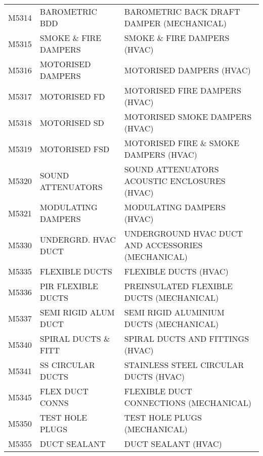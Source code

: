 \begin{longtable}[l]{l%
                  l|%
                  l|}
\rowcolor{thetableheadbgcolor!0.25!white} M5314       & BAROMETRIC BDD   & BAROMETRIC BACK DRAFT DAMPER (MECHANICAL)   \\
\rowcolor{thetableheadbgcolor!0.25!white} M5315       & SMOKE \& FIRE DAMPERS   & SMOKE \& FIRE DAMPERS (HVAC)   \\
\rowcolor{thetableheadbgcolor!0.25!white} M5316       & MOTORISED DAMPERS   & MOTORISED DAMPERS (HVAC)   \\
\rowcolor{thetableheadbgcolor!0.25!white} M5317       & MOTORISED FD   & MOTORISED FIRE DAMPERS (HVAC)   \\
\rowcolor{thetableheadbgcolor!0.25!white} M5318       & MOTORISED SD   & MOTORISED SMOKE DAMPERS (HVAC)   \\
\rowcolor{thetableheadbgcolor!0.25!white} M5319       & MOTORISED FSD   & MOTORISED FIRE \& SMOKE DAMPERS (HVAC)   \\
\rowcolor{thetableheadbgcolor!0.25!white} M5320       & SOUND ATTENUATORS   & SOUND ATTENUATORS ACOUSTIC ENCLOSURES (HVAC)   \\
\rowcolor{thetableheadbgcolor!0.25!white} M5321       & MODULATING DAMPERS   & MODULATING DAMPERS (HVAC)   \\
\rowcolor{thetableheadbgcolor!0.25!white} M5330       & UNDERGRD. HVAC DUCT   & UNDERGROUND HVAC DUCT AND ACCESSORIES (MECHANICAL)   \\
\rowcolor{thetableheadbgcolor!0.25!white} M5335       & FLEXIBLE DUCTS   & FLEXIBLE DUCTS (HVAC)   \\
\rowcolor{thetableheadbgcolor!0.25!white} M5336       & PIR FLEXIBLE DUCTS   & PREINSULATED FLEXIBLE DUCTS (MECHANICAL)   \\
\rowcolor{thetableheadbgcolor!0.25!white} M5337       & SEMI RIGID ALUM DUCT   & SEMI RIGID ALUMINIUM DUCTS (MECHANICAL)   \\
\rowcolor{thetableheadbgcolor!0.25!white} M5340       & SPIRAL DUCTS \& FITT   & SPIRAL DUCTS AND FITTINGS (HVAC)   \\
\rowcolor{thetableheadbgcolor!0.25!white} M5341       & SS CIRCULAR DUCTS   & STAINLESS STEEL CIRCULAR DUCTS (HVAC)   \\
\rowcolor{thetableheadbgcolor!0.25!white} M5345       & FLEX DUCT CONNS   & FLEXIBLE DUCT CONNECTIONS (MECHANICAL)   \\
\rowcolor{thetableheadbgcolor!0.25!white} M5350       & TEST HOLE PLUGS   & TEST HOLE PLUGS (MECHANICAL)   \\
\rowcolor{thetableheadbgcolor!0.25!white} M5355       & DUCT SEALANT   & DUCT SEALANT (HVAC)   \\

\end{longtable}
